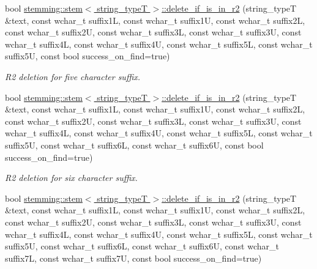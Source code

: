 \begin{DoxyCompactItemize}
\item 
\hypertarget{group___stemming_ga222f7af1124d34e58b3c38fa4b2ee669}{bool \hyperlink{group___stemming_ga222f7af1124d34e58b3c38fa4b2ee669}{stemming\-::stem$<$ string\-\_\-type\-T $>$\-::delete\-\_\-if\-\_\-is\-\_\-in\-\_\-r2} (string\-\_\-type\-T \&text, const wchar\-\_\-t suffix1\-L, const wchar\-\_\-t suffix1\-U, const wchar\-\_\-t suffix2\-L, const wchar\-\_\-t suffix2\-U, const wchar\-\_\-t suffix3\-L, const wchar\-\_\-t suffix3\-U, const wchar\-\_\-t suffix4\-L, const wchar\-\_\-t suffix4\-U, const wchar\-\_\-t suffix5\-L, const wchar\-\_\-t suffix5\-U, const bool success\-\_\-on\-\_\-find=true)}\label{group___stemming_ga222f7af1124d34e58b3c38fa4b2ee669}

\begin{DoxyCompactList}\small\item\em R2 deletion for five character suffix. \end{DoxyCompactList}\item 
\hypertarget{group___stemming_ga95aca52d1f624638130a9d1c66570edb}{bool \hyperlink{group___stemming_ga95aca52d1f624638130a9d1c66570edb}{stemming\-::stem$<$ string\-\_\-type\-T $>$\-::delete\-\_\-if\-\_\-is\-\_\-in\-\_\-r2} (string\-\_\-type\-T \&text, const wchar\-\_\-t suffix1\-L, const wchar\-\_\-t suffix1\-U, const wchar\-\_\-t suffix2\-L, const wchar\-\_\-t suffix2\-U, const wchar\-\_\-t suffix3\-L, const wchar\-\_\-t suffix3\-U, const wchar\-\_\-t suffix4\-L, const wchar\-\_\-t suffix4\-U, const wchar\-\_\-t suffix5\-L, const wchar\-\_\-t suffix5\-U, const wchar\-\_\-t suffix6\-L, const wchar\-\_\-t suffix6\-U, const bool success\-\_\-on\-\_\-find=true)}\label{group___stemming_ga95aca52d1f624638130a9d1c66570edb}

\begin{DoxyCompactList}\small\item\em R2 deletion for six character suffix. \end{DoxyCompactList}\item 
\hypertarget{group___stemming_ga9542e67a264c728cfb636767dc75a07c}{bool \hyperlink{group___stemming_ga9542e67a264c728cfb636767dc75a07c}{stemming\-::stem$<$ string\-\_\-type\-T $>$\-::delete\-\_\-if\-\_\-is\-\_\-in\-\_\-r2} (string\-\_\-type\-T \&text, const wchar\-\_\-t suffix1\-L, const wchar\-\_\-t suffix1\-U, const wchar\-\_\-t suffix2\-L, const wchar\-\_\-t suffix2\-U, const wchar\-\_\-t suffix3\-L, const wchar\-\_\-t suffix3\-U, const wchar\-\_\-t suffix4\-L, const wchar\-\_\-t suffix4\-U, const wchar\-\_\-t suffix5\-L, const wchar\-\_\-t suffix5\-U, const wchar\-\_\-t suffix6\-L, const wchar\-\_\-t suffix6\-U, const wchar\-\_\-t suffix7\-L, const wchar\-\_\-t suffix7\-U, const bool success\-\_\-on\-\_\-find=true)}\label{group___stemming_ga9542e67a264c728cfb636767dc75a07c}


\end{DoxyCompactItemize}
